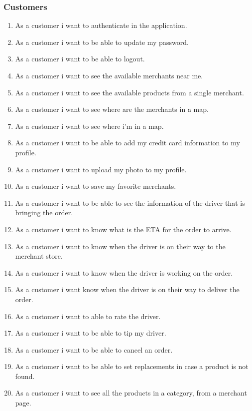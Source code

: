 \subsubsection{Customers}
\begin{enumerate}[resume, label=USR-\arabic*]
    \item As a customer i want to authenticate in the application.
    \item As a customer i want to be able to update my password.
    \item As a customer i want to be able to logout.
    \item As a customer i want to see the available merchants near me.
    \item As a customer i want to see the available products from a single 
    merchant.
    \item As a customer i want to see where are the merchants in a map.
    \item As a customer i want to see where i’m in a map.
    \item As a customer i want to be able to add my credit card information 
    to my profile.
    \item As a customer i want to upload my photo to my profile.
    \item As a customer i want to save my favorite merchants.
    \item As a customer i want to be able to see the information of the driver 
    that is bringing the order.
    \item As a customer i want to know what is the ETA for the order to arrive.
    \item As a customer i want to know when the driver is on their way to the 
    merchant store.
    \item As a customer i want to know when the driver is working on the order.
    \item As a customer i want know when the driver is on their way to deliver 
    the order.
    \item As a customer i want to able to rate the driver.
    \item As a customer i want to be able to tip my driver.
    \item As a customer i want to be able to cancel an order.
    \item As a customer i want to be able to set replacements in case a 
    product is not found.
    \item As a customer i want to see all the products in a category, from a 
    merchant page.

\end{enumerate}
